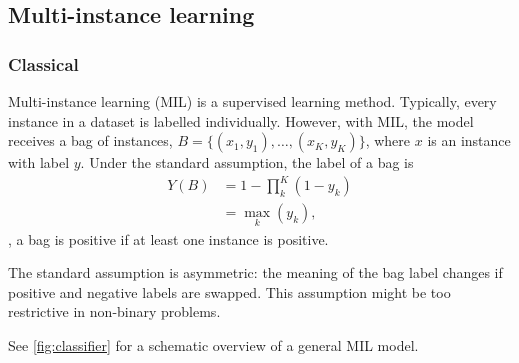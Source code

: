 \subsection{Multi-instance learning}

\subsubsection{Classical}
Multi-instance learning (MIL) is a supervised learning method.
Typically, every instance in a dataset is labelled individually.
However, with MIL, the model receives a bag of instances, $B=\{(x_1,y_1),\ldots,(x_K,y_K)\}$, where $x$ is an instance with label $y$.
Under the standard assumption, the label of a bag is
\begin{align}
    Y(B) &= 1 - \prod_{k}^{K}(1-y_k) \\
         &= \max_k(y_k),
\end{align}
\ie, a bag is positive if at least one instance is positive.

The standard assumption is asymmetric: the meaning of the bag label changes if positive and negative labels are swapped.
This assumption might be too restrictive in non-binary problems.

See \cref{fig:classifier} for a schematic overview of a general MIL model.

\begin{figure*}
    \centering
    
    \caption[Multi-instance learning classification]{
        Extracted features (tile features in this work) are presented to a multi-layer perceptron (MLP) with learnable weights.
        The first MLP outputs an aggregate that summarizes all input features.
        The aggregate is used as input to a classifier MLP with learnable weights that outputs a prediction.
        Weights are updated based on pre-defined loss between prediction and target.
    }
    \label{fig:classifier}
\end{figure*}


